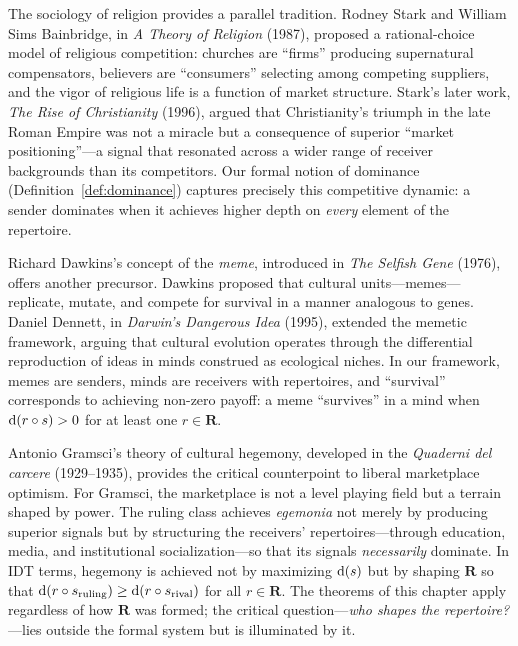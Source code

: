 The sociology of religion provides a parallel tradition.  Rodney Stark and
William Sims Bainbridge, in \textit{A Theory of Religion} (1987), proposed
a rational-choice model of religious competition: churches are ``firms''
producing supernatural compensators, believers are ``consumers'' selecting
among competing suppliers, and the vigor of religious life is a function of
market structure.  Stark's later work, \textit{The Rise of Christianity}
(1996), argued that Christianity's triumph in the late Roman Empire was not
a miracle but a consequence of superior ``market positioning''---a signal
that resonated across a wider range of receiver backgrounds than its
competitors.  Our formal notion of dominance
(Definition~\ref{def:dominance}) captures precisely this competitive
dynamic: a sender dominates when it achieves higher depth on \emph{every}
element of the repertoire.

Richard Dawkins's concept of the \emph{meme}, introduced in \textit{The
Selfish Gene} (1976), offers another precursor.  Dawkins proposed that
cultural units---memes---replicate, mutate, and compete for survival in a
manner analogous to genes.  Daniel Dennett, in \textit{Darwin's Dangerous
Idea} (1995), extended the memetic framework, arguing that cultural
evolution operates through the differential reproduction of ideas in
minds construed as ecological niches.  In our framework, memes are senders,
minds are receivers with repertoires, and ``survival'' corresponds to
achieving non-zero payoff: a meme ``survives'' in a mind when
$\operatorname{d}(r \circ s) > 0$ for at least one $r \in \mathbf{R}$.

Antonio Gramsci's theory of cultural hegemony, developed in the
\textit{Quaderni del carcere} (1929--1935), provides the critical
counterpoint to liberal marketplace optimism.  For Gramsci, the marketplace
is not a level playing field but a terrain shaped by power.  The ruling
class achieves \emph{egemonia} not merely by producing superior signals but
by structuring the receivers' repertoires---through education, media, and
institutional socialization---so that its signals \emph{necessarily}
dominate.  In IDT terms, hegemony is achieved not by maximizing
$\operatorname{d}(s)$ but by shaping $\mathbf{R}$ so that
$\operatorname{d}(r \circ s_{\text{ruling}}) \ge \operatorname{d}(r \circ s_{\text{rival}})$
for all $r \in \mathbf{R}$.  The theorems of this chapter apply regardless
of how $\mathbf{R}$ was formed; the critical question---\emph{who shapes
the repertoire?}---lies outside the formal system but is illuminated by it.

